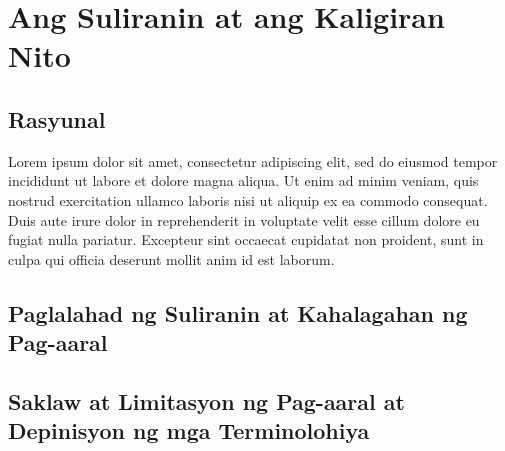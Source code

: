 \documentclass {report}
\begin{document}
\tableofcontents
\pagebreak
\chapter {Ang Suliranin at ang Kaligiran Nito}

\section {Rasyunal}
Lorem ipsum dolor sit amet, consectetur adipiscing elit, sed do eiusmod tempor incididunt ut labore et dolore magna aliqua. Ut enim ad minim veniam, quis nostrud exercitation ullamco laboris nisi ut aliquip ex ea commodo consequat. Duis aute irure dolor in reprehenderit in voluptate velit esse cillum dolore eu fugiat nulla pariatur. Excepteur sint occaecat cupidatat non proident, sunt in culpa qui officia deserunt mollit anim id est laborum.

\pagebreak
\section {Paglalahad ng Suliranin at Kahalagahan ng Pag-aaral}

\pagebreak
\section {Saklaw at Limitasyon ng Pag-aaral at Depinisyon ng mga Terminolohiya}

\pagebreak
\end{document}

